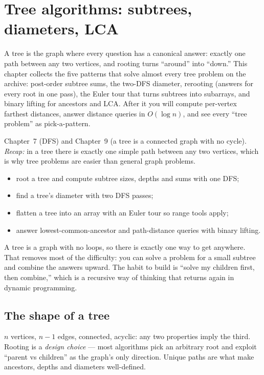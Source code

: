 \chapter{Tree algorithms: subtrees, diameters, LCA}\label{ch:trees}

A tree is the graph where every question has a canonical answer:
exactly one path between any two vertices, and rooting turns
``around'' into ``down.'' This chapter collects the five patterns
that solve almost every tree problem on the archive: post-order
subtree sums, the two-DFS diameter, rerooting (answers for every
root in one pass), the Euler tour that turns subtrees into subarrays,
and binary lifting for ancestors and LCA. After it you will compute
per-vertex farthest distances, answer distance queries in
$O(\log n)$, and see every ``tree problem'' as pick-a-pattern.

\begin{rulebox}
Chapter~7 (DFS) and Chapter~9 (a tree is a connected graph with no cycle). \emph{Recap:} in a tree there is exactly one simple path between any two vertices, which is why tree problems are easier than general graph problems.
\end{rulebox}
\begin{wins}
\begin{itemize}
\item root a tree and compute subtree sizes, depths and sums with one DFS;
\item find a tree's diameter with two DFS passes;
\item flatten a tree into an array with an Euler tour so range tools apply;
\item answer lowest-common-ancestor and path-distance queries with binary lifting.
\end{itemize}
\end{wins}
\begin{principle}
A tree is a graph with no loops, so there is exactly one way to get anywhere. That removes most of the difficulty: you can solve a problem for a small subtree and combine the answers upward. The habit to build is ``solve my children first, then combine,'' which is a recursive way of thinking that returns again in dynamic programming.
\end{principle}

\section{The shape of a tree}\label{sec:tshape}
$n$ vertices, $n{-}1$ edges, connected, acyclic: any two properties
imply the third. Rooting is a \emph{design choice} --- most
algorithms pick an arbitrary root and exploit ``parent vs children''
as the graph's only direction. Unique paths are what make ancestors,
depths and diameters well-defined.

